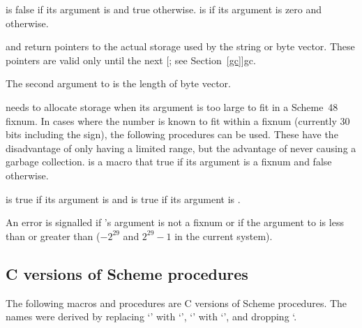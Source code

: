 \noindent{} is false if its argument is
  and true otherwise.
  is  if its argument is zero
  and  otherwise.

  and  return
 pointers to the actual
 storage used by the string or byte vector.
 These pointers are valid only until the next
 [; see Section~\ref{gc}]{gc}.

The second argument to  is the length of
 byte vector.

 needs to allocate storage when
 its argument is too large to fit in a Scheme~48 fixnum.
In cases where the number is known to fit within a fixnum (currently 30 bits
 including the sign), the following procedures can be used.
These have the disadvantage of only having a limited range, but
 the advantage of never causing a garbage collection.
 is a macro that true if its argument is a fixnum
 and false otherwise.

\begin{protos}
\end{protos}

\noindent {} is true if its argument is 
 and  is true if its argument is .

\begin{protos}
\end{protos}

\noindent An error is signalled if 's argument
 is not a fixnum or if the argument to  is less than
  or greater than 
 ($-2^{29}$ and $2^{29}-1$ in the current system).

\subsection{C versions of Scheme procedures}

The following macros and procedures are C versions of Scheme procedures.
The names were derived by replacing `\code{-}' with `\code{\_}',
 `' with `', and dropping `\code{!}.


